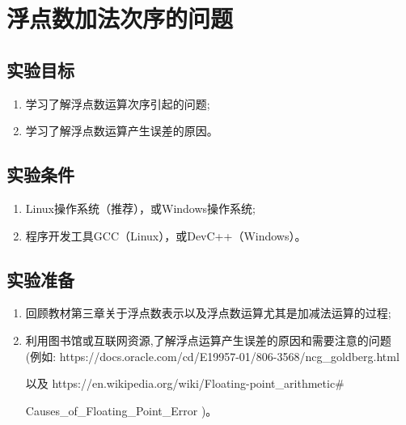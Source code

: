 
\chapter{浮点数加法次序的问题}

\section{实验目标}

\begin{enumerate}
	\item 学习了解浮点数运算次序引起的问题;
	\item 学习了解浮点数运算产生误差的原因。
\end{enumerate}

\section{实验条件}

\begin{enumerate}
	\item Linux操作系统（推荐），或Windows操作系统;
	\item 程序开发工具GCC（Linux），或DevC++（Windows）。
\end{enumerate}

\section{实验准备}

\begin{enumerate}
	\item 回顾教材第三章关于浮点数表示以及浮点数运算尤其是加减法运算的过程;
	\item 利用图书馆或互联网资源,了解浮点运算产生误差的原因和需要注意的问题\\
		(例如: https://docs.oracle.com/cd/E19957-01/806-3568/ncg\_goldberg.html
		
		以及 https://en.wikipedia.org/wiki/Floating-point\_arithmetic\#
		
		Causes\_of\_Floating\_Point\_Error )。
\end{enumerate}

